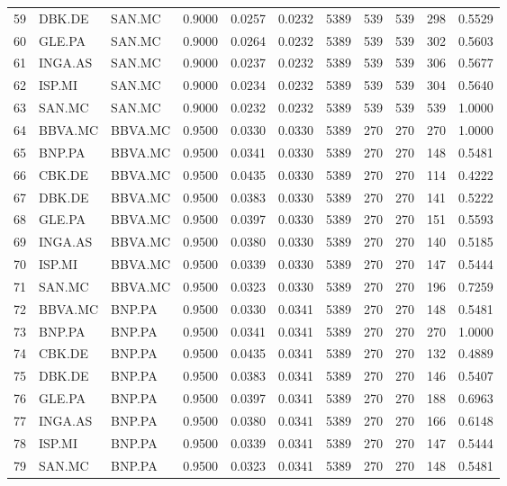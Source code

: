 \begin{table}
\begin{tabular}{lllrrrrrrrr}
59 & DBK.DE & SAN.MC & 0.9000 & 0.0257 & 0.0232 & 5389 & 539 & 539 & 298 & 0.5529 \\
60 & GLE.PA & SAN.MC & 0.9000 & 0.0264 & 0.0232 & 5389 & 539 & 539 & 302 & 0.5603 \\
61 & INGA.AS & SAN.MC & 0.9000 & 0.0237 & 0.0232 & 5389 & 539 & 539 & 306 & 0.5677 \\
62 & ISP.MI & SAN.MC & 0.9000 & 0.0234 & 0.0232 & 5389 & 539 & 539 & 304 & 0.5640 \\
63 & SAN.MC & SAN.MC & 0.9000 & 0.0232 & 0.0232 & 5389 & 539 & 539 & 539 & 1.0000 \\
64 & BBVA.MC & BBVA.MC & 0.9500 & 0.0330 & 0.0330 & 5389 & 270 & 270 & 270 & 1.0000 \\
65 & BNP.PA & BBVA.MC & 0.9500 & 0.0341 & 0.0330 & 5389 & 270 & 270 & 148 & 0.5481 \\
66 & CBK.DE & BBVA.MC & 0.9500 & 0.0435 & 0.0330 & 5389 & 270 & 270 & 114 & 0.4222 \\
67 & DBK.DE & BBVA.MC & 0.9500 & 0.0383 & 0.0330 & 5389 & 270 & 270 & 141 & 0.5222 \\
68 & GLE.PA & BBVA.MC & 0.9500 & 0.0397 & 0.0330 & 5389 & 270 & 270 & 151 & 0.5593 \\
69 & INGA.AS & BBVA.MC & 0.9500 & 0.0380 & 0.0330 & 5389 & 270 & 270 & 140 & 0.5185 \\
70 & ISP.MI & BBVA.MC & 0.9500 & 0.0339 & 0.0330 & 5389 & 270 & 270 & 147 & 0.5444 \\
71 & SAN.MC & BBVA.MC & 0.9500 & 0.0323 & 0.0330 & 5389 & 270 & 270 & 196 & 0.7259 \\
72 & BBVA.MC & BNP.PA & 0.9500 & 0.0330 & 0.0341 & 5389 & 270 & 270 & 148 & 0.5481 \\
73 & BNP.PA & BNP.PA & 0.9500 & 0.0341 & 0.0341 & 5389 & 270 & 270 & 270 & 1.0000 \\
74 & CBK.DE & BNP.PA & 0.9500 & 0.0435 & 0.0341 & 5389 & 270 & 270 & 132 & 0.4889 \\
75 & DBK.DE & BNP.PA & 0.9500 & 0.0383 & 0.0341 & 5389 & 270 & 270 & 146 & 0.5407 \\
76 & GLE.PA & BNP.PA & 0.9500 & 0.0397 & 0.0341 & 5389 & 270 & 270 & 188 & 0.6963 \\
77 & INGA.AS & BNP.PA & 0.9500 & 0.0380 & 0.0341 & 5389 & 270 & 270 & 166 & 0.6148 \\
78 & ISP.MI & BNP.PA & 0.9500 & 0.0339 & 0.0341 & 5389 & 270 & 270 & 147 & 0.5444 \\
79 & SAN.MC & BNP.PA & 0.9500 & 0.0323 & 0.0341 & 5389 & 270 & 270 & 148 & 0.5481 \\

\end{tabular}
\end{table}
